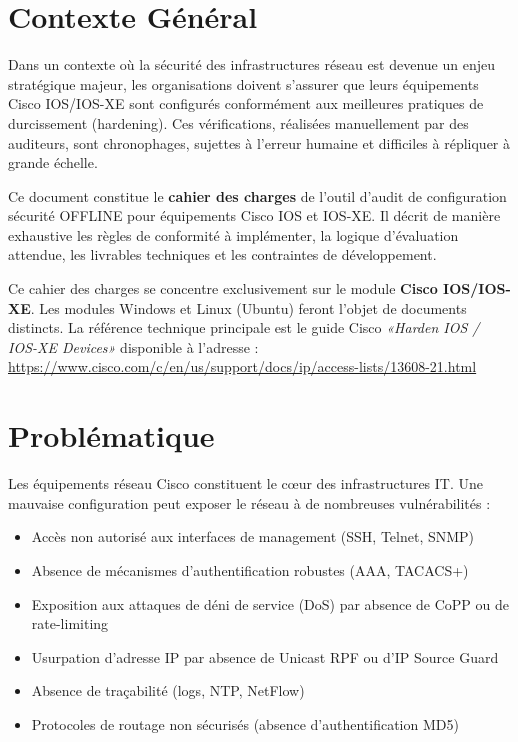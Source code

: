 \documentclass[12pt, a4paper]{report}
\begin{document}
\section{Contexte Général}

Dans un contexte où la sécurité des infrastructures réseau est devenue un enjeu stratégique majeur, les organisations doivent s'assurer que leurs équipements Cisco IOS/IOS-XE sont configurés conformément aux meilleures pratiques de durcissement (hardening). Ces vérifications, réalisées manuellement par des auditeurs, sont chronophages, sujettes à l'erreur humaine et difficiles à répliquer à grande échelle.

Ce document constitue le \textbf{cahier des charges} de l'outil d'audit de configuration sécurité OFFLINE pour équipements Cisco IOS et IOS-XE. Il décrit de manière exhaustive les règles de conformité à implémenter, la logique d'évaluation attendue, les livrables techniques et les contraintes de développement.

\begin{infobox}[title=Périmètre de ce document]
  Ce cahier des charges se concentre exclusivement sur le module \textbf{Cisco IOS/IOS-XE}. Les modules Windows et Linux (Ubuntu) feront l'objet de documents distincts. La référence technique principale est le guide Cisco \textit{«Harden IOS / IOS-XE Devices»} disponible à l'adresse : \url{https://www.cisco.com/c/en/us/support/docs/ip/access-lists/13608-21.html}
\end{infobox}

\section{Problématique}

Les équipements réseau Cisco constituent le cœur des infrastructures IT. Une mauvaise configuration peut exposer le réseau à de nombreuses vulnérabilités :
\begin{itemize}[leftmargin=1.5cm]
  \item Accès non autorisé aux interfaces de management (SSH, Telnet, SNMP)
  \item Absence de mécanismes d'authentification robustes (AAA, TACACS+)
  \item Exposition aux attaques de déni de service (DoS) par absence de CoPP ou de rate-limiting
  \item Usurpation d'adresse IP par absence de Unicast RPF ou d'IP Source Guard
  \item Absence de traçabilité (logs, NTP, NetFlow)
  \item Protocoles de routage non sécurisés (absence d'authentification MD5)
\end{itemize}
\end{document}
